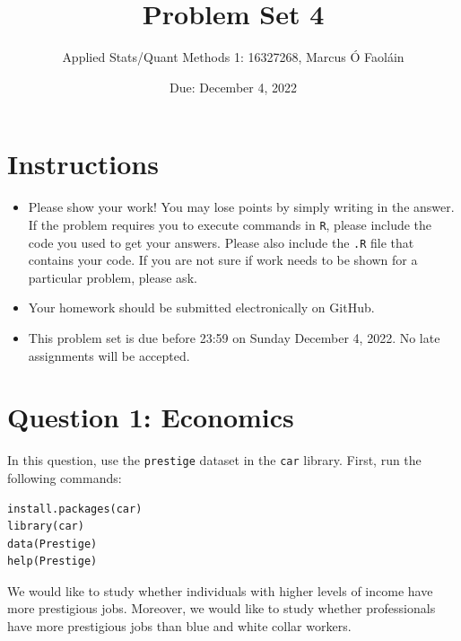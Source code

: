 \documentclass[12pt,letterpaper]{article}
\title{Problem Set 4}
\date{Due: December 4, 2022}
\author{Applied Stats/Quant Methods 1: 16327268, Marcus Ó Faoláin}
\begin{document}
	\maketitle
	\section*{Instructions}
	\begin{itemize}
		\item Please show your work! You may lose points by simply writing in the answer. If the problem requires you to execute commands in \texttt{R}, please include the code you used to get your answers. Please also include the \texttt{.R} file that contains your code. If you are not sure if work needs to be shown for a particular problem, please ask.
		\item Your homework should be submitted electronically on GitHub.
		\item This problem set is due before 23:59 on Sunday December 4, 2022. No late assignments will be accepted.
	\end{itemize}




	\vspace{.5cm}
\section*{Question 1: Economics}
\vspace{.25cm}
\noindent 	
In this question, use the \texttt{prestige} dataset in the \texttt{car} library. First, run the following commands:

\begin{verbatim}
install.packages(car)
library(car)
data(Prestige)
help(Prestige)
\end{verbatim} 


\noindent We would like to study whether individuals with higher levels of income have more prestigious jobs. Moreover, we would like to study whether professionals have more prestigious jobs than blue and white collar workers.
\end{document}
